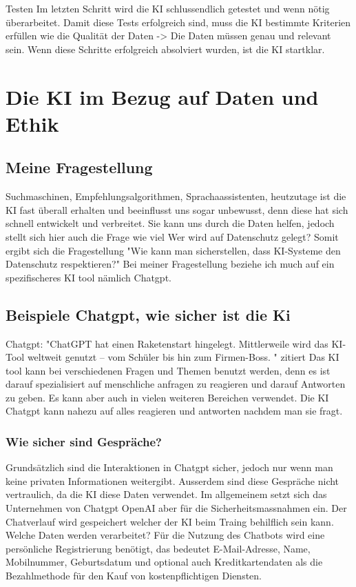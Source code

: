 \documentclass{report}
\begin{document}
Testen 
Im letzten Schritt wird die KI schlussendlich getestet und wenn nötig überarbeitet.
Damit diese Tests erfolgreich sind, muss die KI bestimmte Kriterien erfüllen wie die Qualität der Daten -> Die Daten müssen genau und relevant sein.
Wenn diese Schritte erfolgreich absolviert wurden, ist die KI startklar. 

\chapter{Die KI im Bezug auf Daten und Ethik}
\section{Meine Fragestellung}
Suchmaschinen, Empfehlungsalgorithmen, Sprachaassistenten, heutzutage ist die KI fast überall erhalten und beeinflusst uns sogar unbewusst, denn diese hat sich schnell entwickelt und verbreitet. 
Sie kann uns durch die Daten helfen, jedoch stellt sich hier auch die Frage wie viel Wer wird auf Datenschutz gelegt? 
Somit ergibt sich die Fragestellung "Wie kann man sicherstellen, dass KI-Systeme den Datenschutz respektieren?"
Bei meiner Fragestellung beziehe ich much auf ein spezifischeres KI tool nämlich Chatgpt. 

\section {Beispiele Chatgpt, wie sicher ist die Ki}
Chatgpt: "ChatGPT hat einen Raketenstart hingelegt. Mittlerweile wird das KI-Tool weltweit genutzt – vom Schüler bis hin zum Firmen-Boss. " zitiert
    Das KI tool kann bei verschiedenen Fragen und Themen benutzt werden, denn es ist darauf spezialisiert auf menschliche anfragen zu reagieren und darauf Antworten zu geben. 
    Es kann aber auch in vielen weiteren Bereichen verwendet.
    Die KI Chatgpt kann nahezu auf alles reagieren und antworten nachdem man sie fragt. 

    \subsection{Wie sicher sind Gespräche?}
    Grundsätzlich sind die Interaktionen in Chatgpt sicher, jedoch nur wenn man keine privaten Informationen weitergibt. Ausserdem sind diese Gespräche nicht vertraulich, da die KI diese Daten verwendet.
    Im allgemeinem setzt sich das Unternehmen von Chatgpt OpenAI aber für die Sicherheitsmassnahmen ein.
    Der Chatverlauf wird gespeichert welcher der KI beim Traing behilflich sein kann.
    Welche Daten werden verarbeitet? 
    Für die Nutzung des Chatbots wird eine persönliche Registrierung benötigt, das bedeutet E-Mail-Adresse, Name, Mobilnummer, Geburtsdatum und optional auch Kreditkartendaten als die Bezahlmethode für den Kauf von kostenpflichtigen Diensten.
\end{document}
